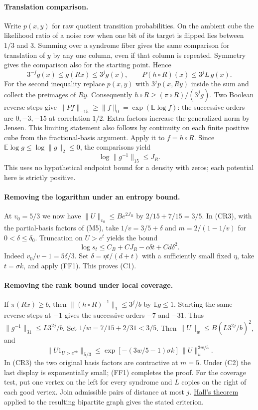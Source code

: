 \paragraph{Translation comparison.} Write $p(x,y)$ for raw quotient transition probabilities. On the ambient cube the likelihood ratio of a noise row when one bit of its target is flipped lies between $1/3$ and $3$. Summing over a syndrome fiber gives the same comparison for translation of $y$ by any one column, even if that column is repeated. Symmetry gives the comparison also for the starting point. Hence
\[
  3^{-j}g(x)\le g(Rx)\le3^j g(x),\qquad
  P(h\circ R)(x)\le 3^j L\,g(x).
\]
For the second inequality replace $p(x,y)$ with $3^jp(x,Ry)$ inside the sum and collect the preimages of $Ry$. Consequently $h\circ R\ge(\pi\circ R)/(3^j g)$.
Two Boolean reverse steps give $\|Pf\|_{-15}\ge\|f\|_0=\exp(\mathbb E\log f)$: the successive orders are $0,-3,-15$ at correlation $1/2$. Extra factors increase the generalized norm by Jensen. This limiting statement also follows by continuity on each finite positive cube from the fractional-basis argument. Apply it to $f=h\circ R$. Since $\mathbb E\log g\le\log\|g\|_2\le0$, the comparisons yield
\[
                 \log\|g^{-1}\|_{15}\le J_R .                 \tag{C3}
\]
This uses no hypothetical endpoint bound for a density with zeros; each potential here is strictly positive.

\paragraph{Removing the logarithm under an entropy bound.}
At $v_0=5/3$ we now have $\|U\|_{v_0}\le B e^{2J_R}$ by $2/15+7/15=3/5$. In (CR3), with the partial-basis factors of (M5), take $1/v=3/5+\delta$ and $m=2/(1-1/v)$ for $0<\delta\le\delta_0$. Truncation on $U>e^t$ yields the bound
\[
 \log s_t\le C_B+C J_R-c\delta t+C d\delta^2 .
\]
Indeed $v_0/v-1=5\delta/3$. Set $\delta=\eta t/(d+t)$ with a sufficiently small fixed $\eta$, take $t=\sigma k$, and apply (FF1). This proves (C1).

\paragraph{Removing the rank bound under local coverage.}
If $\pi(Rx)\ge b$, then $\|(h\circ R)^{-1}\|_1\le3^j/b$ by $\mathbb E g\le1$. Starting the same reverse steps at $-1$ gives the successive orders $-7$ and $-31$. Thus $\|g^{-1}\|_{31}\le L3^{2j}/b$. Set $1/w=7/15+2/31<3/5$. Then $\|U\|_w\le B(L3^{2j}/b)^2$, and
\[
 \|U1_{U>e^{\sigma k}}\|_{5/3}
     \le \exp[-(3w/5-1)\sigma k]\,\|U\|_w^{3w/5}.
\]
In (CR3) the two original basis factors are contractive at $m=5$. Under (C2) the last display is exponentially small; (FF1) completes the proof. For the coverage test, put one vertex on the left for every syndrome and $L$ copies on the right of each good vertex. Join admissible pairs of distance at most $j$. \href{https://doi.org/10.1112/jlms/s1-10.37.26}{Hall's theorem} applied to the resulting bipartite graph gives the stated criterion.

